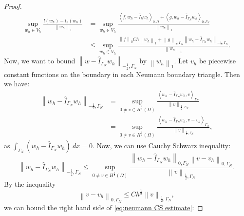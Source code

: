 \documentclass[../Main/main.tex]{subfiles}
\begin{document}
\begin{proof}
		\begin{equation}\label{eq:334}
			\begin{aligned}
				\sup_{w_h \in V_h} \frac{l(w_h)-l_h(w_h)}{\left \| w_h \right \|_1} &= \sup_{w_h \in V_h} \frac{\left \langle f,w_h-\hat{I}_h w_h \right \rangle_{0,\Omega} + \left \langle g,w_h-\hat{I}_{\Gamma_N} w_h \right \rangle_{0,\Gamma_N}}{\left \| w_h \right \|_1}\\
				&\leq \sup_{w_h \in V_h} \frac{\left \|f\right \|_0 Ch\left \|w_h \right \|_1 + \left \|g\right \|_{\frac{1}{2},\Gamma_N}\left \|w_h-\hat{I}_{\Gamma_N} w_h\right \|_{-\frac{1}{2},\Gamma_N}}{\left \| w_h \right \|_1}.
			\end{aligned}
		\end{equation}
		Now, we want to bound $\left \|w-\hat{I}_{\Gamma_N} w_h\right \|_{-\frac{1}{2},\Gamma_N}$ by $\left \| w_h \right \|_1$. Let $v_h$ be piecewise constant functions on the boundary in each Neumann boundary triangle. Then we have:
		\begin{equation}
			\begin{aligned}
				\left \|w_h-\hat{I}_{\Gamma_N} w_h\right \|_{-\frac{1}{2},\Gamma_N} &= \sup_{0 \neq v \in H^{\frac{1}{2}}(\Omega)}\frac{\left \langle w_h-\hat{I}_{\Gamma_N} w_h,v\right \rangle_{\Gamma_N}}{\left \| v \right \|_{\frac{1}{2},\Gamma_N}}\\
				&=\sup_{0 \neq v \in H^{\frac{1}{2}}(\Omega)}\frac{\left \langle w_h-\hat{I}_{\Gamma_N} w_h,v-v_h\right \rangle_{\Gamma_N}}{\left \| v\right \|_{\frac{1}{2},\Gamma_N}},
			\end{aligned}
		\end{equation}
		as $\int_{\Gamma_N} (w_h-\hat{I}_{\Gamma_N} w_h) \ dx = 0$. Now, we can use Cauchy Schwarz inequality:
		\begin{equation}\label{eq:neumann CS estimate}
			\left \|w_h-\hat{I}_{\Gamma_N} w_h\right \|_{-\frac{1}{2},\Gamma_N} \leq \sup_{0 \neq v \in H^{\frac{1}{2}}(\Omega)}\frac{\left \| w_h-\hat{I}_{\Gamma_N} w_h\right \|_{0,\Gamma_N}\left \| v-v_h\right \|_{0,\Gamma_N}}{\left \| v\right \|_{\frac{1}{2},\Gamma_N}}.
		\end{equation}
		By the inequality
		\begin{equation}\label{eq:difficult inequality}
			\left \| v-v_h\right \|_{0,\Gamma_N} \leq C h^{\frac{1}{2}} \left \| v \right \|_{\frac{1}{2}, \Gamma_N},
		\end{equation}
		we can bound the right hand side of  \eqref{eq:neumann CS estimate}: 

\end{proof}
\end{document}
